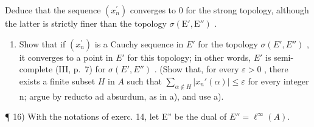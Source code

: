 Deduce that the sequence \((x_{n}^{\prime})\) converges to 0 for the strong topology, although the latter is strictly finer than the topology \(\sigma (\mathrm{E}',\mathrm{E}'')\) .

\begin{enumerate}
\def\labelenumi{\alph{enumi})}
\setcounter{enumi}{1}
\tightlist
\item
  Show that if \((x_{n}^{\prime})\) is a Cauchy sequence in \(E'\) for the topology \(\sigma(E', E'')\) , it converges to a point in \(E'\) for this topology; in other words, \(E'\) is semi-complete (III, p.~7) for \(\sigma(E', E'')\) . (Show that, for every \(\varepsilon > 0\) , there exists a finite subset \(H\) in \(A\) such that \(\sum_{\alpha \notin H} |x_{n}'(\alpha)| \leqslant \varepsilon\) for every integer n; argue by reducto ad absurdum, as in a), and use a).
\end{enumerate}

¶ 16) With the notations of exerc. 14, let E'' be the dual of \(E'' = \ell^{\infty}(A)\).

